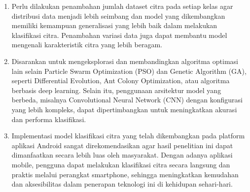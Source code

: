 \begin{enumerate}
    \item Perlu dilakukan penambahan jumlah dataset citra pada setiap kelas agar distribusi data menjadi lebih seimbang dan model yang dikembangkan memiliki kemampuan generalisasi yang lebih baik dalam melakukan klasifikasi citra. Penambahan variasi data juga dapat membantu model mengenali karakteristik citra yang lebih beragam.
    \item Disarankan untuk mengeksplorasi dan membandingkan algoritma optimasi lain selain Particle Swarm Optimization (PSO) dan Genetic Algorithm (GA), seperti Differential Evolution, Ant Colony Optimization, atau algoritma berbasis deep learning. Selain itu, penggunaan arsitektur model yang berbeda, misalnya Convolutional Neural Network (CNN) dengan konfigurasi yang lebih kompleks, dapat dipertimbangkan untuk meningkatkan akurasi dan performa klasifikasi.
    \item Implementasi model klasifikasi citra yang telah dikembangkan pada platform aplikasi Android sangat direkomendasikan agar hasil penelitian ini dapat dimanfaatkan secara lebih luas oleh masyarakat. Dengan adanya aplikasi mobile, pengguna dapat melakukan klasifikasi citra secara langsung dan praktis melalui perangkat smartphone, sehingga meningkatkan kemudahan dan aksesibilitas dalam penerapan teknologi ini di kehidupan sehari-hari.
\end{enumerate}